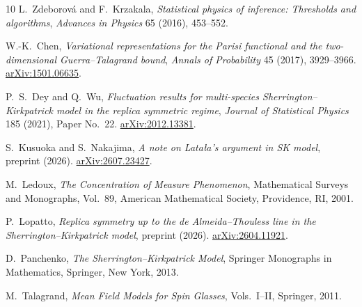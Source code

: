 \documentclass[11pt]{article}
\numberwithin{equation}{section}
\newcommand{\1}{\mathbf 1}
\begin{document}
\begin{thebibliography}{10}
L.~Zdeborov{\'a} and F.~Krzakala,
\newblock
\emph{Statistical physics of inference: Thresholds and algorithms},
\newblock \emph{Advances in Physics} 65 (2016), 453--552.

W.-K.~Chen,
\newblock
\emph{Variational representations for the Parisi functional and the
two-dimensional Guerra--Talagrand bound},
\newblock \emph{Annals of Probability} 45 (2017), 3929--3966.
\href{https://arxiv.org/abs/1501.06635}{arXiv:1501.06635}.

P.~S.~Dey and Q.~Wu,
\newblock
\emph{Fluctuation results for multi-species
Sherrington--Kirkpatrick model in the replica symmetric regime},
\newblock \emph{Journal of Statistical Physics} 185 (2021),
Paper No.~22.
\href{https://arxiv.org/abs/2012.13381}{arXiv:2012.13381}.

\newblock
S.~Kusuoka and S.~Nakajima,
\emph{A note on Lata{\l}a's argument in SK model},
\newblock preprint (2026).
\href{https://arxiv.org/abs/2607.23427}{arXiv:2607.23427}.

M.~Ledoux,
\newblock
\emph{The Concentration of Measure Phenomenon},
\newblock Mathematical Surveys and Monographs, Vol.~89,
American Mathematical Society, Providence, RI, 2001.

P.~Lopatto,
\newblock
\emph{Replica symmetry up to the de Almeida--Thouless line in the
Sherrington--Kirkpatrick model},
\newblock preprint (2026).
\href{https://arxiv.org/abs/2604.11921}{arXiv:2604.11921}.

D.~Panchenko,
\newblock
\emph{The Sherrington--Kirkpatrick Model},
\newblock Springer Monographs in Mathematics, Springer, New York, 2013.

M.~Talagrand,
\newblock
\emph{Mean Field Models for Spin Glasses}, Vols.~I--II,
\newblock Springer, 2011.

\end{thebibliography}
\end{document}
